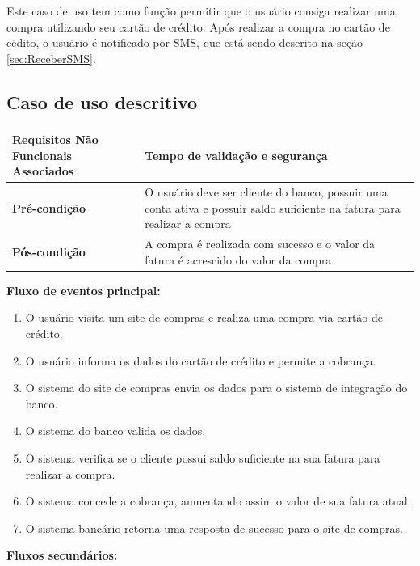 Este caso de uso tem como função permitir que o usuário consiga realizar uma compra utilizando seu cartão de crédito.
Após realizar a compra no cartão de cédito, o usuário é notificado por SMS, que está sendo descrito na seção \ref{sec:ReceberSMS}.

\subsection{Caso de uso descritivo}

\begin{table}[h]
  \centering
  \begin{tabular}{|p{4cm} | p{10cm} |}
      \hline
      \small{\textbf{Requisitos Não Funcionais Associados}}	&	Tempo de validação e segurança	\\ \hline
      \small{\textbf{Pré-condição}}	&	O usuário deve ser cliente do banco, possuir uma conta ativa e possuir saldo suficiente na fatura para realizar a compra	\\ \hline
      \small{\textbf{Pós-condição}}	&	A compra é realizada com sucesso e o valor da fatura é acrescido do valor da compra	\\ \hline
    \end{tabular}
\end{table}

\textbf{Fluxo de eventos principal:}

\begin{enumerate}
  \item O usuário visita um site de compras e realiza uma compra via cartão de crédito.
  \item O usuário informa os dados do cartão de crédito e permite a cobrança.
  \item O sistema do site de compras envia os dados para o sistema de integração do banco.
  \item O sistema do banco valida os dados.
  \item O sistema verifica se o cliente possui saldo suficiente na sua fatura para realizar a compra.
  \item O sistema concede a cobrança, aumentando assim o valor de sua fatura atual.
  \item O sistema bancário retorna uma resposta de sucesso para o site de compras.
\end{enumerate}

\textbf{Fluxos secundários:}

